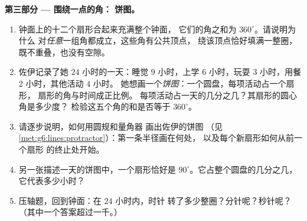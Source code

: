 \begin{problem}
\medskip
\noindent\textbf{第三部分 --- 围绕一点的角：
饼图。}
\begin{enumerate}[resume]
  \item 钟面上的十二个扇形合起来充满整个钟面，
        它们的角之和为 $360^\circ$。请说明为什么
        对\emph{任意}一组角都成立，这些角有公共顶点，
        绕该顶点恰好填满一整圈，
        既不重叠，也没有空隙。
  \item 佐伊记录了她 $24$ 小时的一天：睡觉 $9$ 小时，上学
        $6$ 小时，玩耍 $3$ 小时，用餐 $2$ 小时，其他活动 $4$ 小时。
        她想画一个\emph{饼图}：一个圆盘，每项活动占一个扇形，
        扇形的角与时间成正比例。
        每项活动占一天的几分之几？其扇形的圆心角是多少度？
        检验这五个角的和是否等于
        $360^\circ$。
  \item 请逐步说明，如何用圆规和量角器
        画出佐伊的饼图
        （见\cref{met:g6:lines:protractor}）：第一条半径画在何处，
        以及每个新扇形如何从前一个扇形
        的终止处开始。
  \item 另一张描述一天的饼图中，一个扇形恰好是
        $90^\circ$。它占整个圆盘的几分之几，
        它代表多少小时？
  \item 压轴题，回到钟面：在 $24$ 小时内，时针
        转了多少整圈？分针呢？秒针呢？
        （其中一个答案超过一千。）
\end{enumerate}
\end{problem}
